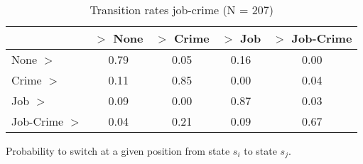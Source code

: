 \begin{table}[htp]
\footnotesize
\setlength{\tabcolsep}{10pt}
\renewcommand{\arraystretch}{1.3}
\begin{threeparttable}
\centering
\caption{Transition rates job-crime (N = 207)} 
\label{tab:transition_rates_anyjob_crime}
\begin{tabular}{lcccc}
  \hline
 & $>$ None & $>$ Crime & $>$ Job & $>$ Job-Crime \\ 
  \hline
None $>$ & 0.79 & 0.05 & 0.16 & 0.00 \\ 
  Crime $>$ & 0.11 & 0.85 & 0.00 & 0.04 \\ 
  Job $>$ & 0.09 & 0.00 & 0.87 & 0.03 \\ 
  Job-Crime $>$ & 0.04 & 0.21 & 0.09 & 0.67 \\ 
   \hline
\end{tabular}
\begin{tablenotes}
\scriptsize
\item Probability to switch at a given position from state $s_i$ to state $s_j$.
\end{tablenotes}
\end{threeparttable}
\end{table}
